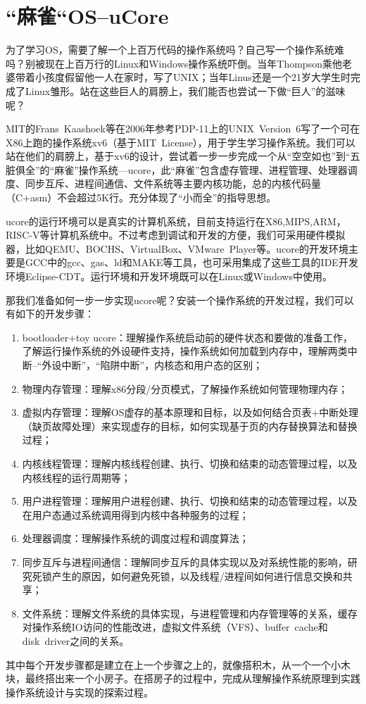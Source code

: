 \section{“麻雀“OS--uCore}

为了学习OS，需要了解一个上百万代码的操作系统吗？自己写一个操作系统难吗？别被现在上百万行的Linux和Windows操作系统吓倒。当年Thompson乘他老婆带着小孩度假留他一人在家时，写了UNIX；当年Linus还是一个21岁大学生时完成了Linux雏形。站在这些巨人的肩膀上，我们能否也尝试一下做“巨人”的滋味呢？

MIT的Frans Kaashoek等在2006年参考PDP-11上的UNIX Version 6写了一个可在X86上跑的操作系统xv6（基于MIT License），用于学生学习操作系统。我们可以站在他们的肩膀上，基于xv6的设计，尝试着一步一步完成一个从“空空如也”到“五脏俱全”的“麻雀”操作系统—ucore，此“麻雀”包含虚存管理、进程管理、处理器调度、同步互斥、进程间通信、文件系统等主要内核功能，总的内核代码量（C+asm）不会超过5K行。充分体现了“小而全”的指导思想。

ucore的运行环境可以是真实的计算机系统，目前支持运行在X86,MIPS,ARM，RISC-V等计算机系统中。不过考虑到调试和开发的方便，我们可采用硬件模拟器，比如QEMU、BOCHS、VirtualBox、VMware Player等。ucore的开发环境主要是GCC中的gcc、gas、ld和MAKE等工具，也可采用集成了这些工具的IDE开发环境Eclipse-CDT。运行环境和开发环境既可以在Linux或Windows中使用。

那我们准备如何一步一步实现ucore呢？安装一个操作系统的开发过程，我们可以有如下的开发步骤：

\begin{enumerate}
	\def\labelenumi{\arabic{enumi}.}
	\item
	bootloader+toy
	ucore：理解操作系统启动前的硬件状态和要做的准备工作，了解运行操作系统的外设硬件支持，操作系统如何加载到内存中，理解两类中断--``外设中断''，``陷阱中断''，内核态和用户态的区别；
	\item
	物理内存管理：理解x86分段/分页模式，了解操作系统如何管理物理内存；
	\item
	虚拟内存管理：理解OS虚存的基本原理和目标，以及如何结合页表+中断处理（缺页故障处理）来实现虚存的目标，如何实现基于页的内存替换算法和替换过程；
	\item
	内核线程管理：理解内核线程创建、执行、切换和结束的动态管理过程，以及内核线程的运行周期等；
	\item
	用户进程管理：理解用户进程创建、执行、切换和结束的动态管理过程，以及在用户态通过系统调用得到内核中各种服务的过程；
	\item
	处理器调度：理解操作系统的调度过程和调度算法；
	\item
	同步互斥与进程间通信：理解同步互斥的具体实现以及对系统性能的影响，研究死锁产生的原因，如何避免死锁，以及线程/进程间如何进行信息交换和共享；
	\item
	文件系统：理解文件系统的具体实现，与进程管理和内存管理等的关系，缓存对操作系统IO访问的性能改进，虚拟文件系统（VFS）、buffer~cache和disk~driver之间的关系。
\end{enumerate}

其中每个开发步骤都是建立在上一个步骤之上的，就像搭积木，从一个一个小木块，最终搭出来一个小房子。在搭房子的过程中，完成从理解操作系统原理到实践操作系统设计与实现的探索过程。

